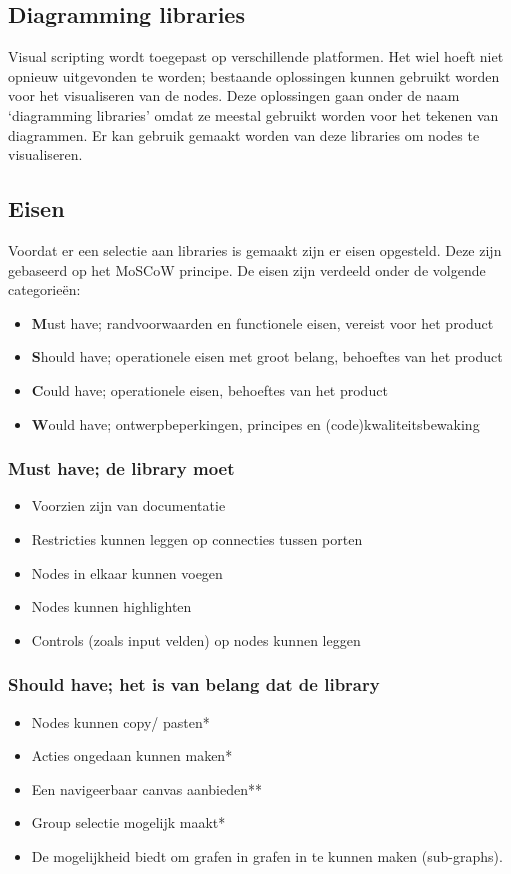 \subsection{Diagramming libraries}
Visual scripting wordt toegepast op verschillende platformen\cite{UnityAssetStoreVisualScripting}\cite{NoFlo}\cite{GitHub3dVisualScripting}. Het wiel hoeft niet opnieuw uitgevonden te worden; bestaande oplossingen kunnen gebruikt worden voor het visualiseren van de nodes. Deze oplossingen gaan onder de naam ‘diagramming libraries’ omdat ze meestal gebruikt worden voor het tekenen van diagrammen. Er kan gebruik gemaakt worden van deze libraries om nodes te visualiseren.

\subsection{Eisen}
Voordat er een selectie aan libraries is gemaakt zijn er eisen opgesteld. Deze zijn gebaseerd op het MoSCoW principe. De eisen zijn verdeeld onder de volgende categorieën:

\begin{itemize}
    \item \textbf{M}ust have; randvoorwaarden en functionele eisen, vereist voor het product
    \item \textbf{S}hould have; operationele eisen met groot belang, behoeftes van het product
    \item \textbf{C}ould have; operationele eisen, behoeftes van het product
    \item \textbf{W}ould have; ontwerpbeperkingen, principes en (code)kwaliteitsbewaking
\end{itemize}

\subsubsection{Must have; de library moet}
\begin{itemize}
    \item Voorzien zijn van documentatie
    \item Restricties kunnen leggen op connecties tussen porten
    \item Nodes in elkaar kunnen voegen
    \item Nodes kunnen highlighten
    \item Controls (zoals input velden) op nodes kunnen leggen
\end{itemize}

\subsubsection{Should have; het is van belang dat de library}
\begin{itemize}
    \item Nodes kunnen copy/ pasten*
    \item Acties ongedaan kunnen maken*
    \item Een navigeerbaar canvas aanbieden**
    \item Group selectie mogelijk maakt*
    \item De mogelijkheid biedt om grafen in grafen in te kunnen maken (sub-graphs).
\end{itemize}


